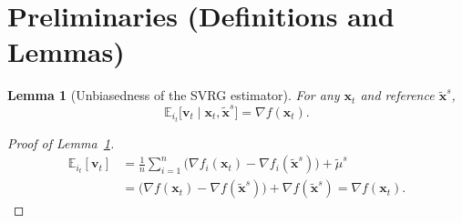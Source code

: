\documentclass{article}
\newtheorem{lemma}{Lemma}
\begin{document}
\newpage
\section*{Preliminaries (Definitions and Lemmas)}
\begin{lemma}[Unbiasedness of the SVRG estimator]\label{lem:unbiased}
For any $\mathbf{x}_t$ and reference $\tilde{\mathbf{x}}^{s}$,
\[
\mathbb{E}_{i_t}\bigl[\mathbf{v}_t\mid \mathbf{x}_t,\tilde{\mathbf{x}}^{s}\bigr]
    =\nabla f(\mathbf{x}_t).
\]
\end{lemma}
\begin{proof}[Proof of Lemma~\ref{lem:unbiased}]
\[
\begin{aligned}
\mathbb{E}_{i_t}[\mathbf{v}_t]
&= \frac{1}{n}\sum_{i=1}^{n}\bigl(\nabla f_i(\mathbf{x}_t)-\nabla f_i(\tilde{\mathbf{x}}^{s})\bigr)+\tilde{\mu}^{s} \\
&= \bigl(\nabla f(\mathbf{x}_t)-\nabla f(\tilde{\mathbf{x}}^{s})\bigr)+\nabla f(\tilde{\mathbf{x}}^{s})
 = \nabla f(\mathbf{x}_t).
\end{aligned}
\]
\end{proof}
\end{document}
